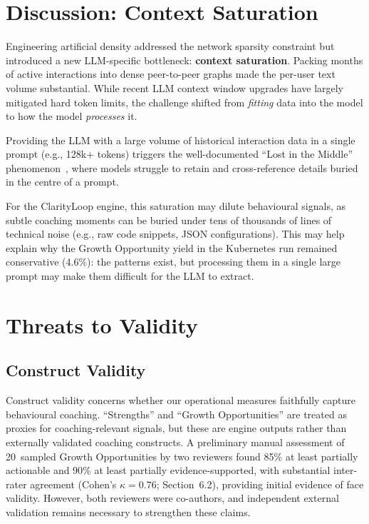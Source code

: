 \documentclass[a4paper,UKenglish,cleveref,autoref]{lipics-v2021}
\begin{document}
\section{Discussion: Context Saturation}
Engineering artificial density addressed the network sparsity constraint but introduced a new LLM-specific bottleneck: \textbf{context saturation}. Packing months of active interactions into dense peer-to-peer graphs made the per-user text volume substantial. While recent LLM context window upgrades have largely mitigated hard token limits, the challenge shifted from \textit{fitting} data into the model to how the model \textit{processes} it.

Providing the LLM with a large volume of historical interaction data in a single prompt (e.g., 128k+ tokens) triggers the well-documented ``Lost in the Middle'' phenomenon~\cite{liu2024lost}, where models struggle to retain and cross-reference details buried in the centre of a prompt.

For the ClarityLoop engine, this saturation may dilute behavioural signals, as subtle coaching moments can be buried under tens of thousands of lines of technical noise (e.g., raw code snippets, JSON configurations). This may help explain why the Growth Opportunity yield in the Kubernetes run remained conservative (4.6\%): the patterns exist, but processing them in a single large prompt may make them difficult for the LLM to extract.

\section{Threats to Validity}

\subsection{Construct Validity}
Construct validity concerns whether our operational measures faithfully capture behavioural coaching. ``Strengths'' and ``Growth Opportunities'' are treated as proxies for coaching-relevant signals, but these are engine outputs rather than externally validated coaching constructs. A preliminary manual assessment of 20~sampled Growth Opportunities by two reviewers found 85\% at least partially actionable and 90\% at least partially evidence-supported, with substantial inter-rater agreement (Cohen's $\kappa = 0.76$; Section~6.2), providing initial evidence of face validity. However, both reviewers were co-authors, and independent external validation remains necessary to strengthen these claims.
\end{document}
